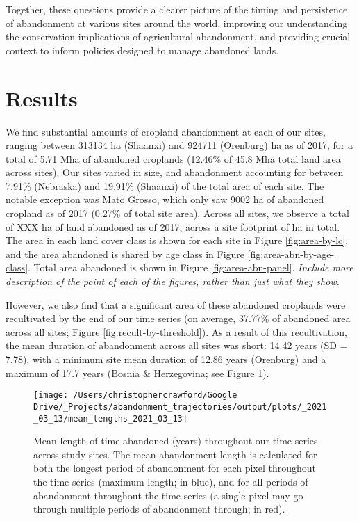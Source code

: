 \documentclass[
]{article}
\begin{document}
Together, these questions provide a clearer picture of the timing and persistence of abandonment at various sites around the world, improving our understanding the conservation implications of agricultural abandonment, and providing crucial context to inform policies designed to manage abandoned lands.

\hypertarget{results}{%
\section{Results}\label{results}}

We find substantial amounts of cropland abandonment at each of our sites, ranging between 313134 ha (Shaanxi) and 924711 (Orenburg) ha as of 2017, for a total of 5.71 Mha of abandoned croplands (12.46\% of 45.8 Mha total land area across sites).
Our sites varied in size, and abandonment accounting for between 7.91\% (Nebraska) and 19.91\% (Shaanxi) of the total area of each site.
The notable exception was Mato Grosso, which only saw 9002 ha of abandoned cropland as of 2017 (0.27\% of total site area).
Across all sites, we observe a total of XXX ha of land abandoned as of 2017, across a site footprint of ha in total.
The area in each land cover class is shown for each site in Figure \ref{fig:area-by-lc}, and the area abandoned is shared by age class in Figure \ref{fig:area-abn-by-age-class}.
Total area abandoned is shown in Figure \ref{fig:area-abn-panel}. \emph{Include more description of the point of each of the figures, rather than just what they show.}

However, we also find that a significant area of these abandoned croplands were recultivated by the end of our time series (on average, 37.77\% of abandoned area across all sites; Figure \ref{fig:recult-by-threshold}).
As a result of this recultivation, the mean duration of abandonment across all sites was short: 14.42 years (SD = 7.78), with a minimum site mean duration of 12.86 years (Orenburg) and a maximum of 17.7 years (Bosnia \& Herzegovina; see Figure \ref{fig:mean-abn-length}).



\begin{figure}
\texttt{[image: /Users/christophercrawford/Google Drive/\_Projects/abandonment\_trajectories/output/plots/\_2021\_03\_13/mean\_lengths\_2021\_03\_13]} \caption{Mean length of time abandoned (years) throughout our time series across study sites. The mean abandonment length is calculated for both the longest period of abandonment for each pixel throughout the time series (maximum length; in blue), and for all periods of abandonment throughout the time series (a single pixel may go through multiple periods of abandonment through; in red).}\label{fig:mean-abn-length}
\end{figure}
\end{document}
